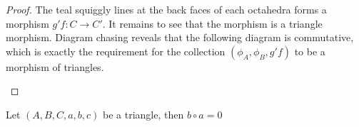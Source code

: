 \begin{proof}
        The teal squiggly lines at the back faces of each octahedra forms a morphism $g'f:C\rightarrow C'$. It remains to see that the morphism is a triangle morphism. Diagram chasing reveals that the following diagram is commutative, which is exactly the requirement for the collection $(\phi_A,\phi_B,g'f)$ to be a morphism of triangles.
        \begin{center}
        \end{center}
    \end{proof}

    \begin{lemma}
        Let $(A,B,C,a,b,c)$ be a triangle, then $b\circ a=0$
    \end{lemma}

